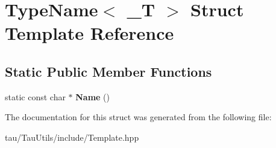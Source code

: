 \hypertarget{struct_type_name}{}\section{Type\+Name$<$ \+\_\+T $>$ Struct Template Reference}
\label{struct_type_name}
\subsection*{Static Public Member Functions}
\begin{DoxyCompactItemize}
\item 
\mbox{\label{struct_type_name_ab7d1e1a476a249512f1809d907ca93b3}} 
static const char $\ast$ {\bfseries Name} ()
\end{DoxyCompactItemize}


The documentation for this struct was generated from the following file\+:\begin{DoxyCompactItemize}
\item 
tau/\+Tau\+Utils/include/Template.\+hpp\end{DoxyCompactItemize}
